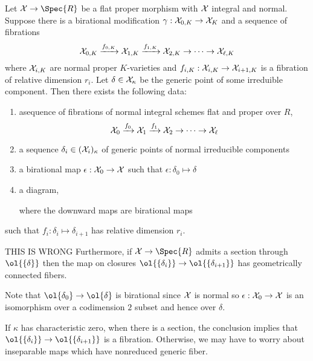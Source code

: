 \documentclass[12pt]{article}
\theoremstyle{plain}
\begin{document}
\begin{prop} \label{lemma:specializations_of_fibrations}
Let $\X \to \Spec{R}$ be a flat proper morphism with $\mathcal{X}$ integral and normal. Suppose there is a birational modification $\gamma : \mathcal{X}_{0,K} \to \mathcal{X}_K$ and a sequence of fibrations
\[ \mathcal{X}_{0,K} \xrightarrow{f_{0,K}} \mathcal{X}_{1,K} \xrightarrow{f_{1,K}} \mathcal{X}_{2,K} \to \cdots \to \mathcal{X}_{\ell,K} \]
where $\mathcal{X}_{i,K}$ are normal proper $K$-varieties and $f_{i,K} : \mathcal{X}_{i,K} \to \mathcal{X}_{i+1,K}$ is a fibration of relative dimension $r_i$. Let $\delta \in \mathcal{X}_{\kappa}$ be the generic point of some irreduible component. Then there exists the following data:
\begin{enumerate}
\item asequence of fibrations of normal integral schemes flat and proper over $R$,
\[ \mathcal{X}_0 \xrightarrow{f_0} \mathcal{X}_1 \xrightarrow{f_1} \mathcal{X}_2 \to \cdots \to \mathcal{X}_\ell \]
\item a sequence $\delta_i \in (\mathcal{X}_i)_{\kappa}$ of generic points of normal irreducible components 
\item a birational map $\epsilon : \mathcal{X}_0 \to \mathcal{X}$ such that $\epsilon : \delta_0 \mapsto \delta$
\item a diagram,
\begin{center}
\end{center}  
where the downward maps are birational maps 
\end{enumerate}
such that $f_i : \delta_i \mapsto \delta_{i+1}$ has relative dimension $r_i$. 


{\color{red} THIS IS WRONG}
Furthermore, if $\X \to \Spec{R}$ admits a section through $\ol{ \{ \delta \} }$ then the map on closures  $\ol{ \{ \delta_i \} } \to \ol{ \{ \delta_{i + 1} \} }$ has geometrically connected fibers.
\end{prop}

Note that $\ol \{ \delta_0 \} \to \ol \{ \delta \}$ is birational since $\mathcal{X}$ is normal so $\epsilon : \mathcal{X}_0 \to \mathcal{X}$ is an isomorphism over a codimension $2$ subset and hence over $\delta$.

\begin{rmk}
If $\kappa$ has characteristic zero, when there is a section, the conclusion implies that $\ol{ \{ \delta_i \} } \to \ol{ \{ \delta_{i + 1} \} }$ is a fibration. Otherwise, we may have to worry about inseparable maps which have nonreduced generic fiber. 
\end{rmk}
\end{document}
